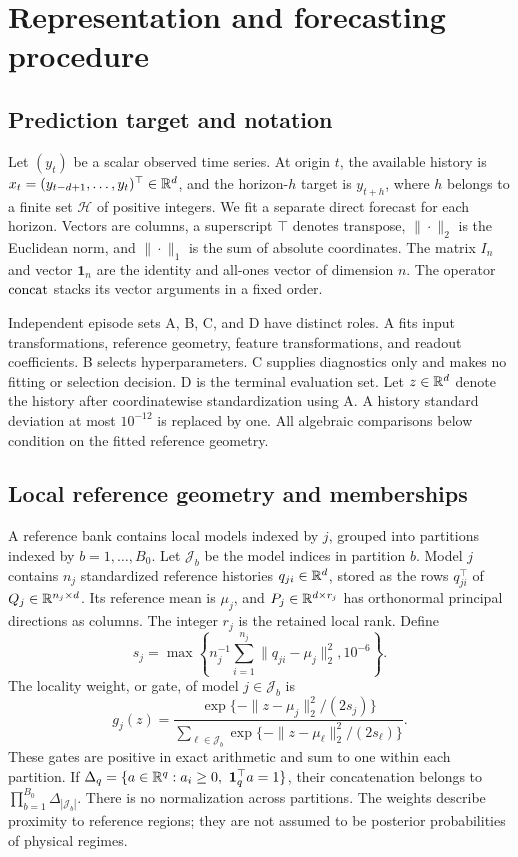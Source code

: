 
\section{Representation and forecasting procedure}\label{sec:method}
\subsection{Prediction target and notation}
Let $(y_t)$ be a scalar observed time series. At origin $t$, the available history is $x_t=(y_{t-d+1},\ldots,y_t)^\top\in\mathbb R^d$, and the horizon-$h$ target is $y_{t+h}$, where $h$ belongs to a finite set $\mathcal H$ of positive integers. We fit a separate direct forecast for each horizon. Vectors are columns, a superscript $\top$ denotes transpose, $\|\cdot\|_2$ is the Euclidean norm, and $\|\cdot\|_1$ is the sum of absolute coordinates. The matrix $I_n$ and vector $\mathbf1_n$ are the identity and all-ones vector of dimension $n$. The operator $\operatorname{concat}$ stacks its vector arguments in a fixed order.

Independent episode sets A, B, C, and D have distinct roles. A fits input transformations, reference geometry, feature transformations, and readout coefficients. B selects hyperparameters. C supplies diagnostics only and makes no fitting or selection decision. D is the terminal evaluation set. Let $z\in\mathbb R^d$ denote the history after coordinatewise standardization using A. A history standard deviation at most $10^{-12}$ is replaced by one. All algebraic comparisons below condition on the fitted reference geometry.

\subsection{Local reference geometry and memberships}
A reference bank contains local models indexed by $j$, grouped into partitions indexed by $b=1,\ldots,B_0$. Let $\mathcal J_b$ be the model indices in partition $b$. Model $j$ contains $n_j$ standardized reference histories $q_{ji}\in\mathbb R^d$, stored as the rows $q_{ji}^\top$ of $Q_j\in\mathbb R^{n_j\times d}$. Its reference mean is $\mu_j$, and $P_j\in\mathbb R^{d\times r_j}$ has orthonormal principal directions as columns. The integer $r_j$ is the retained local rank. Define
\[
 s_j=\max\left\{n_j^{-1}\sum_{i=1}^{n_j}\|q_{ji}-\mu_j\|_2^2,10^{-6}\right\}.
\]
The locality weight, or gate, of model $j\in\mathcal J_b$ is
\begin{equation}
 g_j(z)=\frac{\exp\{-\|z-\mu_j\|_2^2/(2s_j)\}}
 {\sum_{\ell\in\mathcal J_b}\exp\{-\|z-\mu_\ell\|_2^2/(2s_\ell)\}}.
 \label{eq:gates}
\end{equation}
These gates are positive in exact arithmetic and sum to one within each partition. If $\Delta_q=\{a\in\R^q:a_i\geq0,\ \mathbf1_q^\top a=1\}$, their concatenation belongs to $\prod_{b=1}^{B_0}\Delta_{|\mathcal J_b|}$. There is no normalization across partitions. The weights describe proximity to reference regions; they are not assumed to be posterior probabilities of physical regimes.


